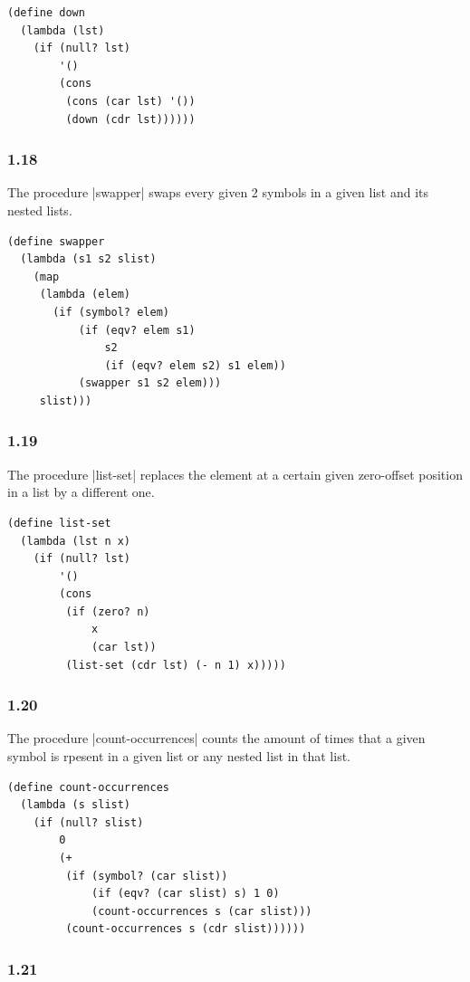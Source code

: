 \documentclass[a4paper]{article}
\begin{document}
\begin{lstlisting}
(define down
  (lambda (lst)
    (if (null? lst)
        '()
        (cons
         (cons (car lst) '())
         (down (cdr lst))))))
\end{lstlisting}

\subsubsection*{1.18}

The procedure |swapper| swaps every given 2 symbols in a given list and its nested lists.

\begin{lstlisting}
(define swapper
  (lambda (s1 s2 slist)
    (map
     (lambda (elem)
       (if (symbol? elem)
           (if (eqv? elem s1)
               s2
               (if (eqv? elem s2) s1 elem))
           (swapper s1 s2 elem)))
     slist)))
\end{lstlisting}

\subsubsection*{1.19}

The procedure |list-set| replaces the element at a certain given zero-offset position in a list by a different one.

\begin{lstlisting}
(define list-set
  (lambda (lst n x)
    (if (null? lst)
        '()
        (cons
         (if (zero? n)
             x
             (car lst))
         (list-set (cdr lst) (- n 1) x)))))
\end{lstlisting}

\subsubsection*{1.20}

The procedure |count-occurrences| counts the amount of times that a given symbol is rpesent in a given list or any nested list in that list.

\begin{lstlisting}
(define count-occurrences
  (lambda (s slist)
    (if (null? slist)
        0
        (+
         (if (symbol? (car slist))
             (if (eqv? (car slist) s) 1 0)
             (count-occurrences s (car slist)))
         (count-occurrences s (cdr slist))))))
\end{lstlisting}

\subsubsection*{1.21}
\end{document}
